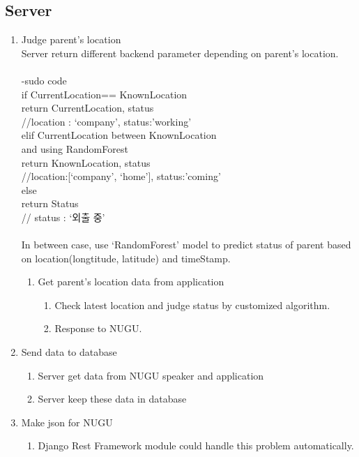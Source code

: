 \documentclass[conference]{IEEEtran}
\begin{document}
\subsection{Server}
\begin{enumerate}
    \item Judge parent’s location\\
    Server return different backend parameter depending on parent’s location.\\ \\
    -sudo code\\
    if CurrentLocation== KnownLocation\\
    return CurrentLocation, status\\
    //{location : ‘company’, status:’working’}\\
    elif CurrentLocation between KnownLocation\\
    and using RandomForest\\
    return KnownLocation, status\\
    //{location:[‘company’, ‘home’], status:’coming’}\\
    else\\
    return Status\\
    // {status : ‘외출 중’}\\ \\
    In between case, use ‘RandomForest’ model to predict status of parent based on location(longtitude, latitude) and timeStamp.
    
    \begin{enumerate}
        \item Get parent’s location data from application
        \begin{enumerate}
            \item Check latest location and judge status by customized algorithm.
            \item Response to NUGU.\\
        \end{enumerate}
    \end{enumerate}
    \item Send data to database
    \begin{enumerate}
        \item Server get data from NUGU speaker and application
        \item Server keep these data in database\\
    \end{enumerate}
    \item Make json for NUGU
    \begin{enumerate}
        \item Django Rest Framework module could handle this problem automatically.\\
    \end{enumerate}
\end{enumerate}
\end{document}
